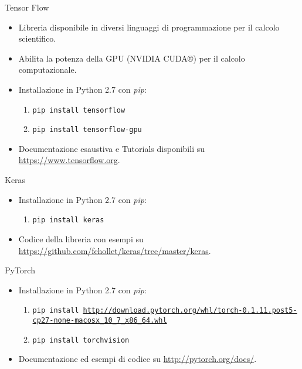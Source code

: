 \documentclass[10pt]{beamer}
\begin{document}
	\begin{frame}{Tensor Flow}

		\begin{itemize}
			\item Libreria disponibile in diversi linguaggi di programmazione per il calcolo scientifico.
			\item Abilita la potenza della GPU (NVIDIA CUDA®) per il calcolo computazionale.
			\item Installazione in Python 2.7 con \textit{pip}:
				\begin{enumerate}
					\item \texttt{pip install tensorflow }
					\item \texttt{pip install tensorflow-gpu}
				\end{enumerate}
			\item Documentazione esaustiva e Tutorials disponibili su \url{https://www.tensorflow.org}.
		\end{itemize}
			
	\end{frame}

	\begin{frame}{Keras}

		\begin{itemize}
			\item Installazione in Python 2.7 con \textit{pip}:
				\begin{enumerate}
					\item \texttt{pip install keras}
				\end{enumerate}
			\item Codice della libreria con esempi su \url{https://github.com/fchollet/keras/tree/master/keras}.
		\end{itemize}
			
	\end{frame}

	\begin{frame}{PyTorch}

		\begin{itemize}
			\item Installazione in Python 2.7 con \textit{pip}:
				\begin{enumerate}
					\item \texttt{pip install \url{http://download.pytorch.org/whl/torch-0.1.11.post5-cp27-none-macosx_10_7_x86_64.whl}}
					\item \texttt{pip install torchvision}
				\end{enumerate}
			\item Documentazione ed esempi di codice su \url{http://pytorch.org/docs/}.
		\end{itemize}
			
	\end{frame}
\end{document}
